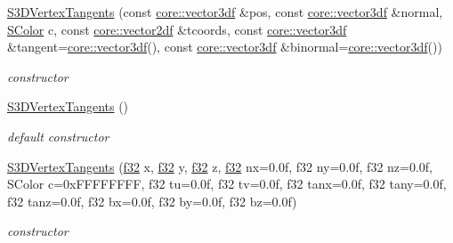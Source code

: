 \begin{DoxyCompactItemize}
\mbox{\label{structirr_1_1video_1_1S3DVertexTangents_a08be9afd37c99f7e95e762340f395eaa}} 
\hyperlink{structirr_1_1video_1_1S3DVertexTangents_a08be9afd37c99f7e95e762340f395eaa}{S3\+D\+Vertex\+Tangents} (const \hyperlink{namespaceirr_1_1core_ae6e2b2a6c552833ebbd5b7463d03586b}{core\+::vector3df} \&pos, const \hyperlink{namespaceirr_1_1core_ae6e2b2a6c552833ebbd5b7463d03586b}{core\+::vector3df} \&normal, \hyperlink{classirr_1_1video_1_1SColor}{S\+Color} c, const \hyperlink{namespaceirr_1_1core_a116f90bd31515724b6235014ee2b74d5}{core\+::vector2df} \&tcoords, const \hyperlink{namespaceirr_1_1core_ae6e2b2a6c552833ebbd5b7463d03586b}{core\+::vector3df} \&tangent=\hyperlink{namespaceirr_1_1core_ae6e2b2a6c552833ebbd5b7463d03586b}{core\+::vector3df}(), const \hyperlink{namespaceirr_1_1core_ae6e2b2a6c552833ebbd5b7463d03586b}{core\+::vector3df} \&binormal=\hyperlink{namespaceirr_1_1core_ae6e2b2a6c552833ebbd5b7463d03586b}{core\+::vector3df}())
\begin{DoxyCompactList}\small\item\em constructor \end{DoxyCompactList}\item 
\mbox{\label{structirr_1_1video_1_1S3DVertexTangents_a73c272df89a8d4d3cb5c94363a4b85d1}} 
\hyperlink{structirr_1_1video_1_1S3DVertexTangents_a73c272df89a8d4d3cb5c94363a4b85d1}{S3\+D\+Vertex\+Tangents} ()
\begin{DoxyCompactList}\small\item\em default constructor \end{DoxyCompactList}\item 
\mbox{\label{structirr_1_1video_1_1S3DVertexTangents_a9e0e424a375e5b090ba5c237a87feff2}} 
\hyperlink{structirr_1_1video_1_1S3DVertexTangents_a9e0e424a375e5b090ba5c237a87feff2}{S3\+D\+Vertex\+Tangents} (\hyperlink{namespaceirr_a0277be98d67dc26ff93b1a6a1d086b07}{f32} x, \hyperlink{namespaceirr_a0277be98d67dc26ff93b1a6a1d086b07}{f32} y, \hyperlink{namespaceirr_a0277be98d67dc26ff93b1a6a1d086b07}{f32} z, \hyperlink{namespaceirr_a0277be98d67dc26ff93b1a6a1d086b07}{f32} nx=0.\+0f, f32 ny=0.\+0f, f32 nz=0.\+0f, S\+Color c=0x\+F\+F\+F\+F\+F\+F\+F\+F, f32 tu=0.\+0f, f32 tv=0.\+0f, f32 tanx=0.\+0f, f32 tany=0.\+0f, f32 tanz=0.\+0f, f32 bx=0.\+0f, f32 by=0.\+0f, f32 bz=0.\+0f)
\begin{DoxyCompactList}\small\item\em constructor \end{DoxyCompactList}\item 

\end{DoxyCompactItemize}
